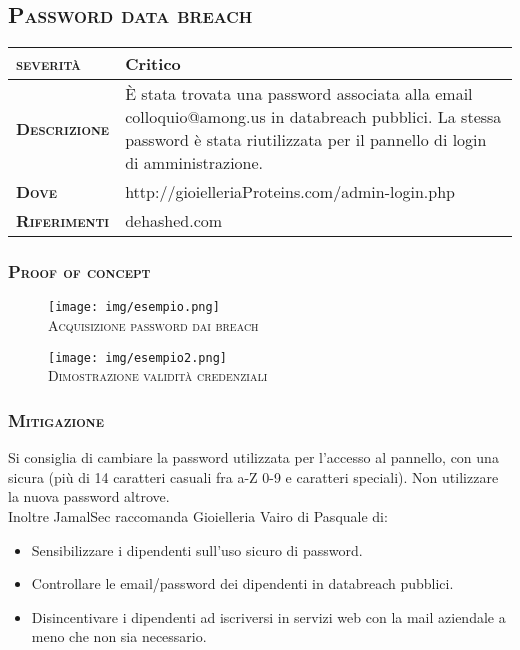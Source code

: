 \begin{cvletter}
   \subsection{\textsc{\color{awesome-red}Pass\color{darktext}word data breach}}


   \color{text}
   \begin{center}
      \begin{tabular}{ |l|p{15cm}| }
         \hline
         \textsc{\textbf{severità}} & \textbf{Critico}\\
         \hline
         \textsc{\textbf{Descrizione}} &
         È stata trovata una password associata alla email colloquio@among.us in databreach pubblici. La stessa password
         è stata riutilizzata per il pannello di login di amministrazione.\\
         \hline
         \textsc{\textbf{Dove}} & http://gioielleriaProteins.com/admin-login.php\\
         \hline
         \textsc{\textbf{Riferimenti}} & dehashed.com\\
         \hline
      \end{tabular}
   \end{center}

   \subsubsection{\textsc{\color{awesome-red}Pro\color{darktext}of of concept}}
   \begin{figure}[ht]
      \centering
      \texttt{[image: img/esempio.png]}\\
      \footnotesize \textsc{Acquisizione password dai breach}
   \end{figure}

   \begin{figure}[ht]
      \centering
      \texttt{[image: img/esempio2.png]}\\
      \footnotesize \textsc{Dimostrazione validità credenziali}
   \end{figure}


   \subsubsection{\textsc{\color{awesome-red}Mit\color{darktext}igazione \faWrench}}
   Si consiglia di cambiare la password utilizzata per l'accesso al pannello, con una sicura (più di 14 caratteri casuali fra 
   a-Z 0-9 e caratteri speciali). Non utilizzare la nuova password altrove.\\
   Inoltre JamalSec raccomanda Gioielleria Vairo di Pasquale di:
   \begin{itemize}
      \item Sensibilizzare i dipendenti sull'uso sicuro di password.
      \item Controllare le email/password dei dipendenti in databreach pubblici.
      \item Disincentivare i dipendenti ad iscriversi in servizi web con la mail aziendale a meno che non sia necessario.
   \end{itemize}

\end{cvletter}

